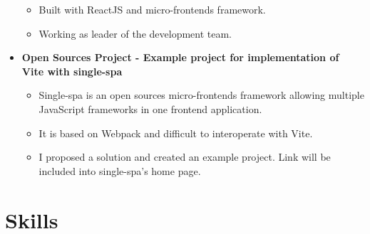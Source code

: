 \begin{itemize}[leftmargin=*]
\begin{itemize}
                \item Built with ReactJS and micro-frontends framework.
                \item Working as leader of the development team.
        \end{itemize}
    \vspace{-10pt}
    \item{\textbf{Open Sources Project - Example project for implementation of Vite with single-spa}}
        \begin{itemize}
                \vspace{-5pt}
                \item Single-spa is an open sources micro-frontends framework allowing multiple JavaScript frameworks in one frontend application.
                \item It is based on Webpack and difficult to interoperate with Vite.
                \item I proposed a solution and created an example project. Link will be included into single-spa's home page.
        \end{itemize}
\end{itemize}
\vspace{5pt}

\section{Skills}
\vspace{5pt}
\begin{itemize}[leftmargin=*]
\end{itemize}



